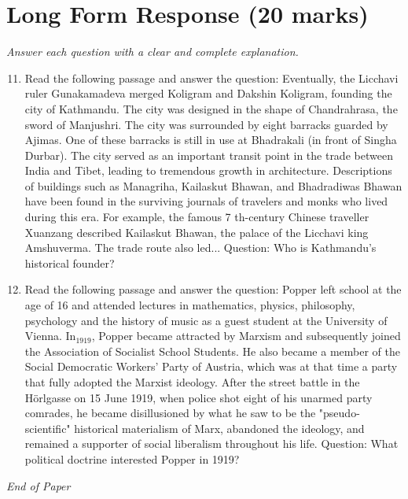\documentclass[12pt]{article}
\begin{document}
\section*{Long Form Response (20 marks)}
\textit{Answer each question with a clear and complete explanation.}
\begin{enumerate}[label=\arabic*.]
\setcounter{enumi}{10}
\item Read the following passage and answer the question: Eventually, the Licchavi ruler Gunakamadeva merged Koligram and Dakshin Koligram, founding the city of Kathmandu. The city was designed in the shape of Chandrahrasa, the sword of Manjushri. The city was surrounded by eight barracks guarded by Ajimas. One of these barracks is still in use at Bhadrakali (in front of Singha Durbar). The city served as an important transit point in the trade between India and Tibet, leading to tremendous growth in architecture. Descriptions of buildings such as Managriha, Kailaskut Bhawan, and Bhadradiwas Bhawan have been found in the surviving journals of travelers and monks who lived during this era. For example, the famous 7 th-century Chinese traveller Xuanzang described Kailaskut Bhawan, the palace of the Licchavi king Amshuverma. The trade route also led... Question: Who is Kathmandu's historical founder?
\item Read the following passage and answer the question: Popper left school at the age of 16 and attended lectures in mathematics, physics, philosophy, psychology and the history of music as a guest student at the University of Vienna. In$_{1919}$, Popper became attracted by Marxism and subsequently joined the Association of Socialist School Students. He also became a member of the Social Democratic Workers' Party of Austria, which was at that time a party that fully adopted the Marxist ideology. After the street battle in the Hörlgasse on 15 June 1919, when police shot eight of his unarmed party comrades, he became disillusioned by what he saw to be the "pseudo-scientific" historical materialism of Marx, abandoned the ideology, and remained a supporter of social liberalism throughout his life. Question: What political doctrine interested Popper in 1919?
\end{enumerate}

\vfill
\noindent\textit{End of Paper}
\end{document}
